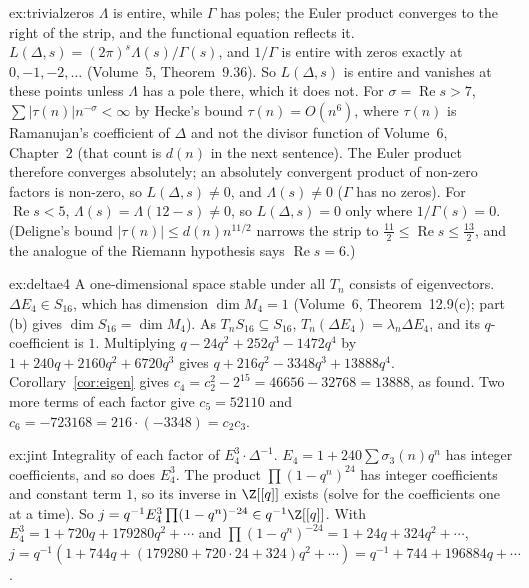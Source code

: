 \begin{solution}{ex:trivialzeros}
\idea $\Lambda$ is entire, while $\Gamma$ has poles; the Euler product converges to the right of the strip, and the functional equation reflects it.
\writeup $L(\Delta,s)=(2\pi)^s\Lambda(s)/\Gamma(s)$, and $1/\Gamma$ is entire with zeros exactly at $0,-1,-2,\dots$ (Volume~5, Theorem~9.36). So $L(\Delta,s)$ is entire and vanishes
at these points unless $\Lambda$ has a pole there, which it does not. For $\sigma=\operatorname{Re}s>7$, $\sum|\tau(n)|n^{-\sigma}<\infty$ by Hecke's bound $\tau(n)=O(n^6)$, where $\tau(n)$ is Ramanujan's coefficient of $\Delta$ and not the divisor function of Volume~6, Chapter~2 (that count is $d(n)$ in the next sentence). The Euler
product therefore converges absolutely; an absolutely convergent product of non-zero factors is non-zero, so $L(\Delta,s)\ne0$, and $\Lambda(s)\ne0$ ($\Gamma$ has no zeros). For
$\operatorname{Re}s<5$, $\Lambda(s)=\Lambda(12-s)\ne0$, so $L(\Delta,s)=0$ only where $1/\Gamma(s)=0$. (Deligne's bound $|\tau(n)|\le d(n)n^{11/2}$ narrows the strip to
$\frac{11}2\le\operatorname{Re}s\le\frac{13}2$, and the analogue of the Riemann hypothesis says $\operatorname{Re}s=6$.)
\end{solution}

\begin{solution}{ex:deltae4}
\idea A one-dimensional space stable under all $T_n$ consists of eigenvectors.
\writeup $\Delta E_4\in S_{16}$, which has dimension $\dim M_4=1$ (Volume~6, Theorem~12.9(c); part (b) gives $\dim S_{16}=\dim M_4$). As $T_nS_{16}\subseteq S_{16}$, $T_n(\Delta E_4)=\lambda_n\Delta E_4$, and its $q$-coefficient is
$1$. Multiplying $q-24q^2+252q^3-1472q^4$ by $1+240q+2160q^2+6720q^3$ gives $q+216q^2-3348q^3+13888q^4$. Corollary~\ref{cor:eigen} gives $c_4=c_2^2-2^{15}=46656-32768=13888$, as
found. Two more terms of each factor give $c_5=52110$ and $c_6=-723168=216\cdot(-3348)=c_2c_3$.
\end{solution}

\begin{solution}{ex:jint}
\idea Integrality of each factor of $E_4^3\cdot\Delta^{-1}$.
\writeup $E_4=1+240\sum\sigma_3(n)q^n$ has integer coefficients, and so does $E_4^3$. The product $\prod(1-q^n)^{24}$ has integer coefficients and constant term $1$, so its
inverse in $\Z[[q]]$ exists (solve for the coefficients one at a time). So $j=q^{-1}E_4^3\prod(1-q^n)^{-24}\in q^{-1}\Z[[q]]$. With $E_4^3=1+720q+179280q^2+\cdots$ and
$\prod(1-q^n)^{-24}=1+24q+324q^2+\cdots$, $j=q^{-1}(1+744q+(179280+720\cdot24+324)q^2+\cdots)=q^{-1}+744+196884q+\cdots$.
\end{solution}

